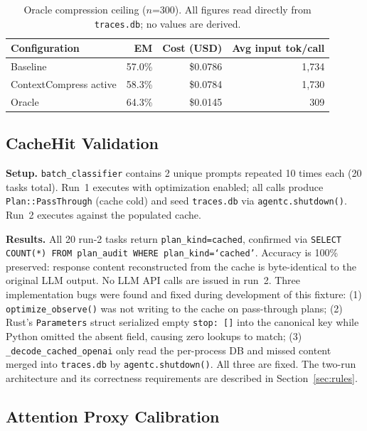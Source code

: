 \documentclass[sigconf,9pt]{acmart}
\begin{document}
\begin{table}[t]
\caption{Oracle compression ceiling ($n$=300). All figures read directly from
\texttt{traces.db}; no values are derived.}
\label{tab:oracle}
\small
\begin{tabular}{lrrr}
\toprule
Configuration & EM & Cost (USD) & Avg input tok/call \\
\midrule
Baseline               & 57.0\% & \$0.0786 & 1,734 \\
ContextCompress active & 58.3\% & \$0.0784 & 1,730 \\
Oracle                 & 64.3\% & \$0.0145 &   309 \\
\bottomrule
\end{tabular}
\end{table}

\subsection{CacheHit Validation}
\label{sec:eval-cachehit}

\textbf{Setup.} \texttt{batch\_classifier} contains 2 unique prompts repeated 10
times each (20 tasks total). Run~1 executes with optimization enabled; all calls
produce \texttt{Plan::PassThrough} (cache cold) and seed \texttt{traces.db} via
\texttt{agentc.shutdown()}. Run~2 executes against the populated cache.

\textbf{Results.} All 20 run-2 tasks return \texttt{plan\_kind=cached}, confirmed
via \texttt{SELECT COUNT(*) FROM plan\_audit WHERE plan\_kind=`cached'}.
Accuracy is 100\% preserved: response content reconstructed from the cache is
byte-identical to the original LLM output. No LLM API calls are issued in run~2.
Three implementation bugs were found and fixed during development of this fixture:
(1) \texttt{optimize\_observe()} was not writing to the cache on pass-through plans;
(2) Rust's \texttt{Parameters} struct serialized empty \texttt{stop:~[]} into the
canonical key while Python omitted the absent field, causing zero lookups to match;
(3) \texttt{\_decode\_cached\_openai} only read the per-process DB and missed content
merged into \texttt{traces.db} by \texttt{agentc.shutdown()}. All three are fixed.
The two-run architecture and its correctness requirements are described in
Section~\ref{sec:rules}.

\subsection{Attention Proxy Calibration}
\label{sec:eval-proxy}
\end{document}
